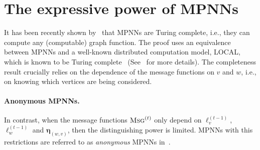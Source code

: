 \documentclass[10pt,a4paper]{article}
\theoremstyle{definition}
\begin{document}
\section{The expressive power of MPNNs}
It has been recently shown by~\citet{Loukas2019} that MPNNs are Turing complete, i.e., they can compute any (computable) graph function. The proof uses an equivalence between MPNNs and a well-known distributed computation model, LOCAL, which is known to be Turing complete~\citep{Angluin} (See~\citep{Loukas2019} for more details). The completeness result crucially relies on the dependence of the message functions on $v$ and $w$, i.e., on knowing which vertices are being considered.

\paragraph{Anonymous MPNNs.} In contrast, when the message functions 
$\textsc{Msg}^{(t)}$ only depend on $\pmb{\ell}_v^{(t-1)}$, $\pmb{\ell}_w^{(t-1)}$ and $\pmb{\eta}_{(w,v)}$, then the distinguishing power is limited. MPNNs with this restrictions are referred to as \textit{anonymous} MPNNs in~\citep{Loukas2019}.
%
%
%
%
%
%
%
%
%
%
\end{document}
